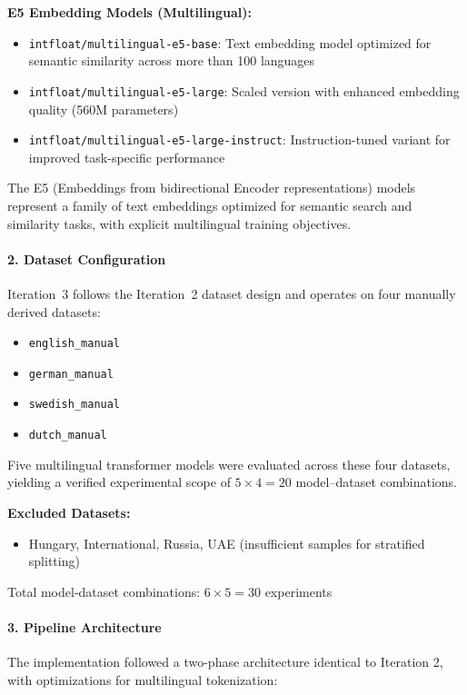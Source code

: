 \documentclass[11pt, titlepage, bibliography=totoc]{scrreprt}
\begin{document}
\textbf{E5 Embedding Models (Multilingual):}
\begin{itemize}
    \item \texttt{intfloat/multilingual-e5-base}: Text embedding model optimized for semantic similarity across more than 100 languages
    \item \texttt{intfloat/multilingual-e5-large}: Scaled version with enhanced embedding quality (560M parameters)
    \item \texttt{intfloat/multilingual-e5-large-instruct}: Instruction-tuned variant for improved task-specific performance
\end{itemize}

The E5 (Embeddings from bidirectional Encoder representations) models represent a family of text embeddings optimized for semantic search and similarity tasks, with explicit multilingual training objectives.

\paragraph{2. Dataset Configuration}
Iteration~3 follows the Iteration~2 dataset design and operates on four manually derived datasets:

\begin{itemize}
    \item \texttt{english\_manual}
    \item \texttt{german\_manual}
    \item \texttt{swedish\_manual}
    \item \texttt{dutch\_manual}
\end{itemize}

Five multilingual transformer models were evaluated across these four datasets, yielding a verified experimental scope of $5 \times 4 = 20$ model--dataset combinations.

\textbf{Excluded Datasets:}
\begin{itemize}
    \item Hungary, International, Russia, UAE (insufficient samples for stratified splitting)
\end{itemize}

Total model-dataset combinations: $6 \times 5 = 30$ experiments

\paragraph{3. Pipeline Architecture}
The implementation followed a two-phase architecture identical to Iteration 2, with optimizations for multilingual tokenization:
\end{document}
